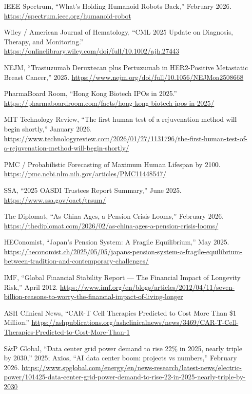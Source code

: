 \documentclass[11pt,a4paper]{article}
\begin{document}
\noindent [38] IEEE Spectrum, ``What's Holding Humanoid Robots Back,'' February 2026. \url{https://spectrum.ieee.org/humanoid-robot}

\noindent [39] Wiley / American Journal of Hematology, ``CML 2025 Update on Diagnosis, Therapy, and Monitoring.'' \url{https://onlinelibrary.wiley.com/doi/full/10.1002/ajh.27443}

\noindent [40] NEJM, ``Trastuzumab Deruxtecan plus Pertuzumab in HER2-Positive Metastatic Breast Cancer,'' 2025. \url{https://www.nejm.org/doi/full/10.1056/NEJMoa2508668}

\noindent [41] PharmaBoard Room, ``Hong Kong Biotech IPOs in 2025.'' \url{https://pharmaboardroom.com/facts/hong-kong-biotech-ipos-in-2025/}

\noindent [42] MIT Technology Review, ``The first human test of a rejuvenation method will begin shortly,'' January 2026. \url{https://www.technologyreview.com/2026/01/27/1131796/the-first-human-test-of-a-rejuvenation-method-will-begin-shortly/}

\noindent [43] PMC / Probabilistic Forecasting of Maximum Human Lifespan by 2100. \url{https://pmc.ncbi.nlm.nih.gov/articles/PMC11448547/}

\noindent [44] SSA, ``2025 OASDI Trustees Report Summary,'' June 2025. \url{https://www.ssa.gov/oact/trsum/}

\noindent [45] The Diplomat, ``As China Ages, a Pension Crisis Looms,'' February 2026. \url{https://thediplomat.com/2026/02/as-china-ages-a-pension-crisis-looms/}

\noindent [46] HEConomist, ``Japan's Pension System: A Fragile Equilibrium,'' May 2025. \url{https://heconomist.ch/2025/05/05/japans-pension-system-a-fragile-equilibrium-between-tradition-and-contemporary-challenges/}

\noindent [47] IMF, ``Global Financial Stability Report --- The Financial Impact of Longevity Risk,'' April 2012. \url{https://www.imf.org/en/blogs/articles/2012/04/11/seven-billion-reasons-to-worry-the-financial-impact-of-living-longer}

\noindent [48] ASH Clinical News, ``CAR-T Cell Therapies Predicted to Cost More Than \$1 Million.'' \url{https://ashpublications.org/ashclinicalnews/news/3469/CAR-T-Cell-Therapies-Predicted-to-Cost-More-Than-1}

\noindent [49] S\&P Global, ``Data center grid power demand to rise 22\% in 2025, nearly triple by 2030,'' 2025; Axios, ``AI data center boom: projects vs numbers,'' February 2026. \url{https://www.spglobal.com/energy/en/news-research/latest-news/electric-power/101425-data-center-grid-power-demand-to-rise-22-in-2025-nearly-triple-by-2030}
\end{document}
